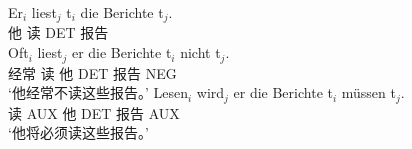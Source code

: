 \eal
\ex 
\gll Er$_i$ liest$_j$ t$_i$ die Berichte t$_j$.\\
	 他 读 {}    DET 报告\\
\ex 
\gll Oft$_i$ liest$_j$ er die Berichte t$_i$ nicht t$_j$.\\
	经常 读 他 DET 报告 {} NEG\\
\glt `他经常不读这些报告。'
\ex 
\gll Lesen$_i$ wird$_j$ er die Berichte t$_i$ müssen t$_j$.\\
	 读 AUX 他 DET 报告 {} AUX\\
\glt `他将必须读这些报告。'
\zl

